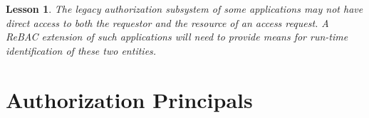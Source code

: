 \documentclass{acm_proc_article-sp}
\newcommand{\ToDo}[1]{\emph{[\textbf{To Do:} #1]}}
\newtheorem{lesson}{Lesson}
\begin{document}
\begin{lesson}
  The legacy authorization subsystem of some applications may not have
  direct access to both the requestor and the resource of an access
  request.  A ReBAC extension of such applications will need to
  provide means for run-time identification of these two entities.
\end{lesson}






\begin{comment}
\ToDo{
Pending revisions:
\begin{enumerate}
\item In the second paragraph where you mention the ``Context'' being
  passed as an argument for the ReBAC authorization advice, is
  actually incorrect. The ``Context'' class contains public static
  methods, that are accessible by every class.
\item In the second paragraph where you mention that the identity of
  the service layer method being invoked is provided by the ``Context'',
  is also incorrect. The advice contains a method called invoke which
  gets an argument of type ``MethodInvocation.'' The method being
  invoked is identified through this argument.
\begin{itemize}
\item the arguments of the invoked method is also contained in
  ``MethodInvocation''
\end{itemize}
\item When you discuss ``setter'' and ``getter'' method, you mention
  that in OpenMRS there is no way to identify if a method is a setter
  or a getter. This is also incorrect. OpenMRS actually uses method
  naming conventions for setter and getter methods. This is a built in
  mechanism in OpenMRS used for logging purposes.
\end{enumerate}
}
\end{comment}




\section{Authorization Principals}
\label{sec-auth-prin}
\end{document}
